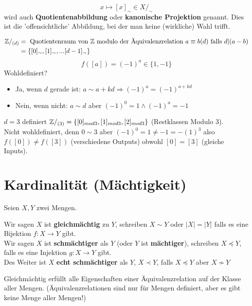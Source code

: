 \documentclass[main.tex]{subfiles}
\begin{document}
\begin{Definition}
  $$x\mapsto [x]_\sim \in X/_\sim$$
  wird auch \textbf{Quotientenabbildung} oder \textbf{kanonische Projektion} genannt. Dies ist die 'offensichtliche' Abbildung, bei der man keine (wirkliche) Wahl trifft.
\end{Definition}

\begin{Beispiel}
  $$\begin{aligned}
    \mathbb{Z}/_{(d)}  &= \text{ Quotientenraum von $\mathbb{Z}$ modulo der Äquivalenzrelation } a \equiv b (d) \text{ falls } d|(a-b)\\
    &= \{[0]_\sim, [1]_\sim, ...[d-1]_\sim\}
  \end{aligned}$$
  $$f([a])=(-1)^{a} \in \{1,-1\}$$
  Wohldefiniert?\\
  \begin{itemize}
    \item Ja, wenn $d$ gerade ist: $a \sim a+kd \Rightarrow (-1)^a=(-1)^{a+kd}$
    \item Nein, wenn nicht: $a \sim d$ aber $(-1)^0 = 1 \land (-1)^a = -1$
  \end{itemize}
  \begin{Beispiel}
    $d=3$ definiert $\mathbb{Z}/_{(3)} = \{[0]_{mod 3},[1]_{mod 3},[2]_{mod 3}\}$ (Restklassen Modulo 3).\\
    Nicht wohldefiniert, denn $0 \sim 3$ aber $(-1)^0 = 1 \neq -1 = -(1)^3$ also $f([0]) \neq f([3])$ (verschiedene Outputs) obwohl $[0] = [3]$ (gleiche Inputs).
  \end{Beispiel}
\end{Beispiel}



\section{Kardinalität (Mächtigkeit)}

\begin{Definition}
  Seien $X,Y$ zwei Mengen.

  Wir sagen $X$ ist \textbf{gleichmächtig} zu $Y$, schreiben $X\sim Y$ oder $|X|=|Y|$ falls es eine Bijektion $f:X\to Y$ gibt.\\
  Wir sagen $X$ ist \textbf{schmächtiger} als $Y$ (oder $Y$ ist \textbf{mächtiger}), schreiben $X\preccurlyeq Y$, falls es eine Injektion $g:X\to Y$ gibt.\\
  Des Weiter ist $X$ \textbf{echt schmächtiger} als $Y$, $X \prec Y$, falls $X \preccurlyeq Y$ aber $X \not\sim Y$
\end{Definition}
\begin{Theorem}
  Gleichmächtig erfüllt alle Eigenschaften einer Äquivalenzrelation auf der Klasse aller Mengen. (Äquivalenzrelationen sind nur für Mengen definiert, aber es gibt keine Menge aller Mengen!)
\end{Theorem}
\end{document}
